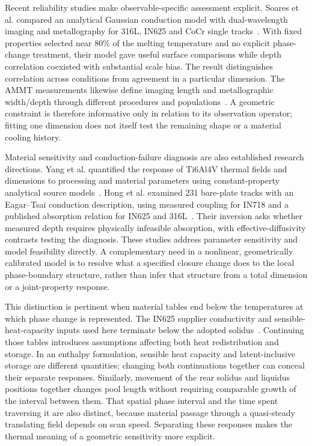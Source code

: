 Recent reliability studies make observable-specific assessment explicit. Soares et al. compared an analytical Gaussian conduction model with dual-wavelength imaging and metallography for 316L, IN625 and CoCr single tracks~\cite{soares2026}. With fixed properties selected near 80\% of the melting temperature and no explicit phase-change treatment, their model gave useful surface comparisons while depth correlation coexisted with substantial scale bias. The result distinguishes correlation across conditions from agreement in a particular dimension. The AMMT measurements likewise define imaging length and metallographic width/depth through different procedures and populations~\cite{lane2020}. A geometric constraint is therefore informative only in relation to its observation operator; fitting one dimension does not itself test the remaining shape or a material cooling history.

Material sensitivity and conduction-failure diagnosis are also established research directions. Yang et al. quantified the response of Ti6Al4V thermal fields and dimensions to processing and material parameters using constant-property analytical source models~\cite{yang2024}. Hong et al. examined 231 bare-plate tracks with an Eagar--Tsai conduction description, using measured coupling for IN718 and a published absorption relation for IN625 and 316L~\cite{hong2026}. Their inversion asks whether measured depth requires physically infeasible absorption, with effective-diffusivity contrasts testing the diagnosis. These studies address parameter sensitivity and model feasibility directly. A complementary need in a nonlinear, geometrically calibrated model is to resolve what a specified closure change does to the local phase-boundary structure, rather than infer that structure from a total dimension or a joint-property response.

This distinction is pertinent when material tables end below the temperatures at which phase change is represented. The IN625 supplier conductivity and sensible-heat-capacity inputs used here terminate below the adopted solidus~\cite{specialmetals625}. Continuing those tables introduces assumptions affecting both heat redistribution and storage. In an enthalpy formulation, sensible heat capacity and latent-inclusive storage are different quantities; changing both continuations together can conceal their separate responses. Similarly, movement of the rear solidus and liquidus positions together changes pool length without requiring comparable growth of the interval between them. That spatial phase interval and the time spent traversing it are also distinct, because material passage through a quasi-steady translating field depends on scan speed. Separating these responses makes the thermal meaning of a geometric sensitivity more explicit.

